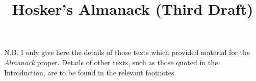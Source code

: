 \documentclass{amsbook}
\title{Hosker's Almanack (Third Draft)}
\begin{document}
\frontmatter
\maketitle

\tableofcontents
\listoffigures



\mainmatter
\renewcommand\thesection{{\Roman{section}}}
\renewcommand\thefootnote{{\thesubsection}}
\makeatletter
\def\blfootnote{\xdef\@thefnmark{}\@footnotetext}
\renewcommand{\@makefnmark}{\hbox{{{{\@thefnmark}}}}\hbox{{{{ }}}}}
\makeatother



\renewcommand\thesection{{\arabic{section}}}
\renewcommand\thefootnote{{\arabic{section}}}



\printbibliography[title={Sources}]

\bigskip

{\footnotesize N.B. I only give here the details of those texts which provided material for the \emph{Almanack} proper. Details of other texts, such as those quoted in the Introduction, are to be found in the relevant footnotes.}
\end{document}

